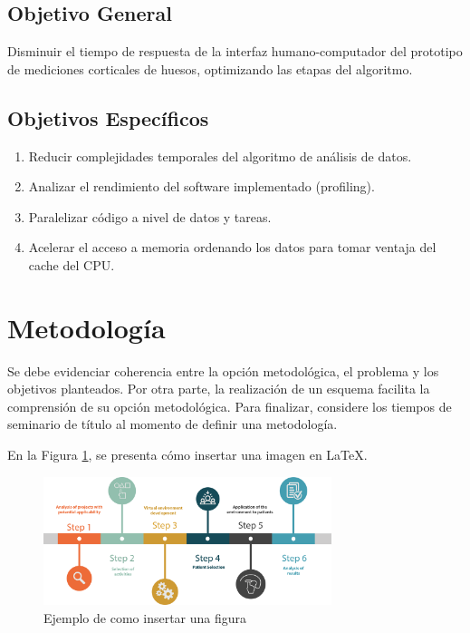 \subsection{Objetivo General}
\label{sc:OG}
Disminuir el tiempo de respuesta de la interfaz humano-computador del prototipo de mediciones corticales de huesos, optimizando las etapas del algoritmo.


\subsection{Objetivos Específicos}
\label{ssc:OE}
\begin{enumerate}
	\item Reducir complejidades temporales del algoritmo de análisis de datos.
	\item Analizar el rendimiento del software implementado (profiling). 
	\item Paralelizar código a nivel de datos y tareas.
	\item Acelerar el acceso a memoria ordenando los datos para tomar ventaja del cache del CPU.   
\end{enumerate}





\section{Metodología}
\label{sc:Met}

Se debe evidenciar coherencia entre la opción metodológica, el problema y los objetivos planteados.
Por otra parte, la realización de un esquema facilita la comprensión de su opción metodológica. Para finalizar, considere los tiempos de seminario de título al momento de definir una metodología.


En la Figura \ref{fig:met}, se presenta cómo insertar una imagen en \LaTeX{}.
\begin{figure}[H]
    \centering
    \includegraphics[width=0.75\textwidth]{imagenes/Fig_ejMet.png}
    \caption{Ejemplo de como insertar una figura}
    \label{fig:met}
\end{figure}



